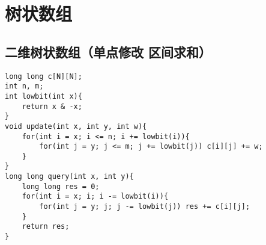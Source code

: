 \section{树状数组}
\subsection{二维树状数组（单点修改 区间求和）}
 \begin{lstlisting}
long long c[N][N];
int n, m;
int lowbit(int x){
    return x & -x;
}
void update(int x, int y, int w){
    for(int i = x; i <= n; i += lowbit(i)){
        for(int j = y; j <= m; j += lowbit(j)) c[i][j] += w;
    }
}
long long query(int x, int y){
    long long res = 0;
    for(int i = x; i; i -= lowbit(i)){
        for(int j = y; j; j -= lowbit(j)) res += c[i][j];
    }
    return res;
}
 \end{lstlisting}